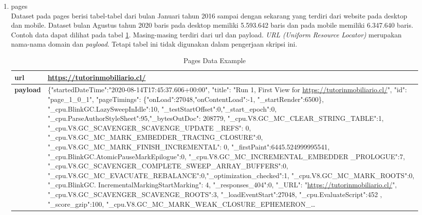 \begin{enumerate}
\item pages\\
Dataset pada pages berisi tabel-tabel dari bulan Januari tahun 2016 sampai dengan sekarang yang terdiri dari website pada desktop dan mobile. Dataset bulan Agustus tahun 2020 baris pada desktop memiliki 5.593.642 baris dan pada mobile memiliki 6.347.640 baris. Contoh data dapat dilihat pada tabel \ref{table:pages_data_sample}.
Masing-masing terdiri dari url dan payload. \textit{URL (Uniform Resource Locator)} merupakan nama-nama domain dan \textit{payload}. Tetapi tabel ini tidak digunakan dalam pengerjaan skripsi ini.

\begin{table}[H]
	\centering
	\begin{tabular*}{\textwidth}{|l|p{14.13cm}|}
		\hline
		\textbf{url} & \url{https://tutorinmobiliario.cl/}\\ 
		\hline
		\textbf{payload} & \{"startedDateTime":"2020-08-14T17:45:37.606+00:00", "title": "Run 1, First View for \url{https://tutorinmobiliario.cl/}", "id": "page\_1\_0\_1", "pageTimings": \{"onLoad":27048,"onContentLoad":-1, "\_startRender":6500\}, "\_cpu.BlinkGC.LazySweepInIdle":10, "\_testStartOffset":0,"\_start\_epoch":0, "\_cpu.ParseAuthorStyleSheet":95,"\_bytesOutDoc": 208779, "\_cpu.V8.GC\_MC\_CLEAR\_STRING\_TABLE":1, "\_cpu.V8.GC\_SCAVENGER\_SCAVENGE\_UPDATE \_REFS": 0, "\_cpu.V8.GC\_MC\_MARK\_EMBEDDER\_TRACING\_CLOSURE":0, "\_cpu.V8.GC\_MC\_MARK\_FINISH\_INCREMENTAL": 0, "\_firstPaint":6445.524999995541, "\_cpu.BlinkGC.AtomicPauseMarkEpilogue":0,  "\_cpu.V8.GC\_MC\_INCREMENTAL\_EMBEDDER \_PROLOGUE":7, "\_cpu.V8.GC\_SCAVENGER\_COMPLETE\_SWEEP\_ARRAY\_BUFFERS":0, "\_cpu.V8.GC\_MC\_EVACUATE\_REBALANCE":0,"\_optimization\_checked":1, "\_cpu.V8.GC\_MC\_MARK\_ROOTS":0, "\_cpu.BlinkGC. IncrementalMarkingStartMarking": 4, "\_responses\_404":0, "\_URL": "\url{https://tutorinmobiliario.cl/}", "\_cpu.V8.GC\_SCAVENGER\_SCAVENGE\_ROOTS":3, "\_loadEventStart":27048, "\_cpu.EvaluateScript":452 , "\_score\_gzip":100, "\_cpu.V8.GC\_MC\_MARK\_WEAK\_CLOSURE\_EPHEMERON\_…\\
		\hline
		
	\end{tabular*}
	\caption{Pages Data Example}
	\label{table:pages_data_sample}
\end{table}


\end{enumerate}

